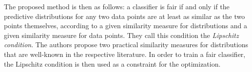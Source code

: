 The proposed method is then as follows: a classifier is fair
if and only if the predictive distributions for any two data points
are at least as similar as the two points themselves,
according to a given similarity measure for distributions
and a given similarity measure for data points.
They call this condition the \emph{Lipschitz condition}.
The authors propose two practical similarity measures for distributions
that are well-known in the respective literature.
In order to train a fair classifier,
the Lipschitz condition is then used as a constraint for the optimization.



